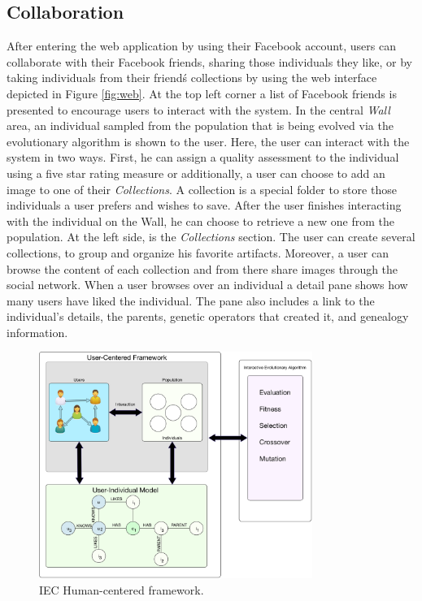 \documentclass[conference]{IEEEtran}
\begin{document}
\subsection{Collaboration}
\label{sec:col}
After entering the web application by using their Facebook account,
users can collaborate with their Facebook friends, 
sharing those individuals they like, or by taking individuals
from their friend\'s collections by using the web interface depicted 
in Figure \ref{fig:web}.
At the top left corner a list of Facebook friends is presented
to encourage users to interact with the system. In the central 
\emph{ Wall } area, an individual sampled from the population that is
being evolved via the evolutionary algorithm 
is shown to the user.
Here, the user can interact with the system in two ways.
First, he can assign a quality assessment to the individual using
a five star rating measure or
additionally, a user can choose to add an image to one of their \emph{Collections}.
A collection is a special folder to store those individuals a user prefers and wishes
to save. After the user finishes interacting with the individual
on the Wall, he can choose to retrieve a new one from the population.
At the left side, is the \emph{Collections} section.
The user can create several collections, to group and organize his favorite 
artifacts. Moreover, a user can browse the content of each collection and from
there share images through the social network.
When a user browses over an individual a detail pane shows how many users have
liked the individual. The pane also includes a link to the individual's 
details, the parents, genetic operators that created it, and genealogy information.

\begin{figure}[!t]
    \centering
        \includegraphics[width=3.5in]{img/framework.png}
    \caption{IEC Human-centered framework.}
    \label{fig:uc_framework}
\end{figure}
\end{document}
